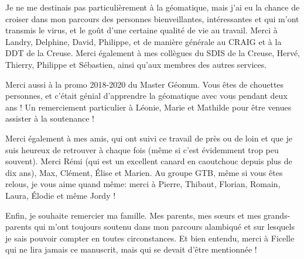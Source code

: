 Je ne me destinais pas particulièrement à la géomatique, mais j'ai eu la chance de croiser dans mon parcours des personnes bienveillantes, intéressantes et qui m'ont transmis le virus, et le goût d'une certaine qualité de vie au travail. Merci à Landry, Delphine, David, Philippe, et de manière générale au CRAIG et à la DDT de la Creuse. Merci également à mes collègues du SDIS de la Creuse, Hervé, Thierry, Philippe et Sébastien, ainsi qu'aux membres des autres services. 

\newpar{}

Merci aussi à la promo 2018-2020 du Master Géonum. Vous êtes de chouettes personnes, et c'était génial d'apprendre la géomatique avec vous pendant deux ans ! Un remerciement particulier à Léonie, Marie et Mathilde pour être venues assister à la soutenance !

\newpar{}

Merci également à mes amis, qui ont suivi ce travail de près ou de loin et que je suis heureux de retrouver à chaque fois (même si c'est évidemment trop peu souvent). Merci Rémi (qui est un excellent canard en caoutchouc depuis plus de dix ans), Max, Clément, Élise et Marien. Au groupe GTB, même si vous êtes relous, je vous aime quand même: merci à Pierre, Thibaut, Florian, Romain, Laura, Élodie et même Jordy !

\newpar{}

Enfin, je souhaite remercier ma famille. Mes parents, mes sœurs et mes grands-parents qui m'ont toujours soutenu dans mon parcours alambiqué et sur lesquels je sais pouvoir compter en toutes circonstances. Et bien entendu, merci à Ficelle qui ne lira jamais ce manuscrit, mais qui se devait d'être mentionnée !
